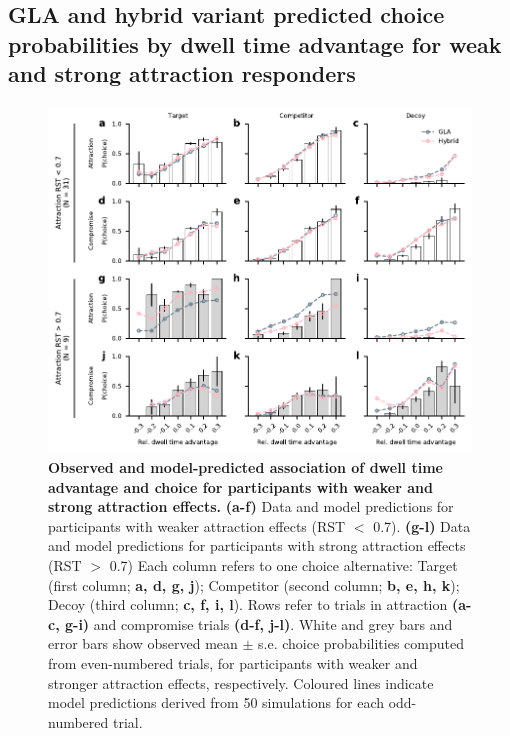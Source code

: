 \documentclass[11pt, a4paper]{article}
\begin{document}
\subsection*{GLA and hybrid variant predicted choice probabilities by dwell time advantage for weak and strong attraction responders}
\begin{figure}[!ht]
\begin{centering}
\includegraphics[scale=1]{../figures/S_dwell-advantage_subgroups_gla-hybrid.pdf}
\caption{\textbf{Observed and model-predicted association of dwell time advantage and choice for participants with weaker and strong attraction effects.} \textbf{(a-f)} Data and model predictions for participants with weaker attraction effects (RST $<$ 0.7). \textbf{(g-l)} Data and model predictions for participants with strong attraction effects (RST $>$ 0.7) Each column refers to one choice alternative: Target (first column; \textbf{a, d, g, j}); Competitor (second column; \textbf{b, e, h, k}); Decoy (third column; \textbf{c, f, i, l}). Rows refer to trials in attraction \textbf{(a-c, g-i)} and compromise trials \textbf{(d-f, j-l)}. White and grey bars and error bars show observed mean $\pm$ s.e. choice probabilities computed from even-numbered trials, for participants with weaker and stronger attraction effects, respectively. Coloured lines indicate model predictions derived from 50 simulations for each odd-numbered trial.}
\label{fig:rdt-adv-subgroups}
\end{centering}
\end{figure}
\newpage
\end{document}
